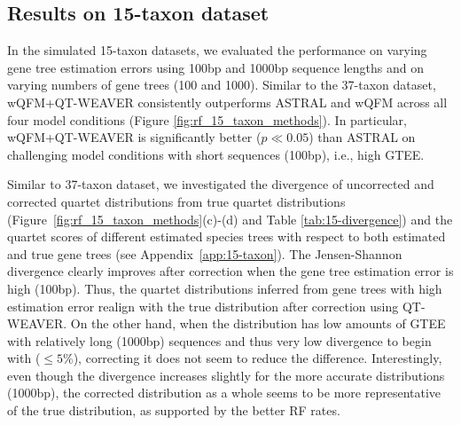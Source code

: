 \documentclass[10pt,a4paper]{article}
\begin{document}

\subsection{Results on 15-taxon dataset}

In the simulated 15-taxon datasets, we evaluated the performance on varying gene tree estimation errors using 100bp and 1000bp sequence lengths and on varying numbers of gene trees (100 and 1000). Similar to the 37-taxon dataset, wQFM+QT-WEAVER consistently outperforms ASTRAL and wQFM across all four model conditions (Figure \ref{fig:rf_15_taxon_methods}). In particular, wQFM+QT-WEAVER is significantly better ($p \ll 0.05$) than ASTRAL on challenging model conditions with short sequences (100bp), i.e., high GTEE. %

Similar to 37-taxon dataset, we investigated the divergence of uncorrected and corrected quartet distributions from true quartet distributions (Figure~\ref{fig:rf_15_taxon_methods}(c)-(d) and Table \ref{tab:15-divergence}) and the quartet scores of different estimated species trees with respect to both estimated and true gene trees (see Appendix~\ref{app:15-taxon}). 
The Jensen-Shannon divergence clearly improves after correction when the gene tree estimation error is high (100bp). Thus, the quartet distributions inferred from gene trees with high estimation error realign with the true distribution after correction using QT-WEAVER. On the other hand, when the distribution has low amounts of GTEE with relatively long (1000bp) sequences and thus very low divergence to begin with ($\le 5$\%), correcting it does not seem to reduce the difference. Interestingly, even though the divergence increases slightly for the more accurate distributions (1000bp), the corrected distribution as a whole seems to be more representative of the true distribution, as supported by the better RF rates.
\end{document}
